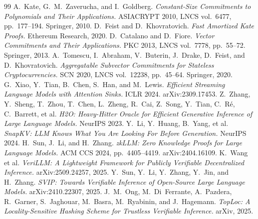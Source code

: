 \begin{thebibliography}{99}
 A.~Kate, G.~M.~Zaverucha, and I.~Goldberg.
  \emph{Constant-Size Commitments to Polynomials and Their Applications.}
  ASIACRYPT 2010, LNCS vol.~6477, pp.~177--194. Springer, 2010.
 D.~Feist and D.~Khovratovich.
  \emph{Fast Amortized Kate Proofs.} Ethereum Research, 2020.
 D.~Catalano and D.~Fiore.
  \emph{Vector Commitments and Their Applications.} PKC 2013, LNCS vol.~7778,
  pp.~55--72. Springer, 2013.
 A.~Tomescu, I.~Abraham, V.~Buterin, J.~Drake, D.~Feist, and
  D.~Khovratovich. \emph{Aggregatable Subvector Commitments for Stateless
  Cryptocurrencies.} SCN 2020, LNCS vol.~12238, pp.~45--64. Springer, 2020.
 G.~Xiao, Y.~Tian, B.~Chen, S.~Han, and M.~Lewis.
  \emph{Efficient Streaming Language Models with Attention Sinks.}
  ICLR 2024. arXiv:2309.17453.
 Z.~Zhang, Y.~Sheng, T.~Zhou, T.~Chen, L.~Zheng, R.~Cai, Z.~Song,
  Y.~Tian, C.~R\'e, C.~Barrett, et al.
  \emph{H2O: Heavy-Hitter Oracle for Efficient Generative Inference of Large
  Language Models.} NeurIPS 2023.
 Y.~Li, Y.~Huang, B.~Yang, et al.
  \emph{SnapKV: LLM Knows What You Are Looking For Before Generation.}
  NeurIPS 2024.
 H.~Sun, J.~Li, and H.~Zhang.
  \emph{zkLLM: Zero Knowledge Proofs for Large Language Models.}
  ACM CCS 2024, pp.~4405--4419. arXiv:2404.16109.
 K.~Wang et al.
  \emph{VeriLLM: A Lightweight Framework for Publicly Verifiable Decentralized
  Inference.} arXiv:2509.24257, 2025.
 Y.~Sun, Y.~Li, Y.~Zhang, Y.~Jin, and H.~Zhang.
  \emph{SVIP: Towards Verifiable Inference of Open-Source Large Language Models.}
  arXiv:2410.22307, 2025.
 J.~M.~Ong, M.~Di~Ferrante, A.~Pazdera, R.~Garner, S.~Jaghouar,
  M.~Basra, M.~Ryabinin, and J.~Hagemann.
  \emph{TopLoc: A Locality-Sensitive Hashing Scheme for Trustless Verifiable
  Inference.} arXiv, 2025.
\end{thebibliography}


